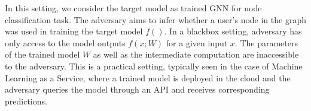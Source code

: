 In this setting, we consider the target model as trained GNN for node classification task.
The adversary aims to infer whether a user's node in the graph was used in training the target model $f()$.
In a blackbox setting, adversary has only access to the model outputs $f(x;W)$ for a given input $x$.
The parameters of the trained model $W$ as well as the intermediate computation are inaccessible to the adversary.
This is a practical setting, typically seen in the case of Machine Learning as a Service, where a trained model is deployed in the cloud and the adversary queries the model through an API and receives corresponding predictions.


\begin{figure}[!htb]
    \centering
    \begin{minipage}[b]{1\linewidth}
    \centering


\end{minipage}
\end{figure}
